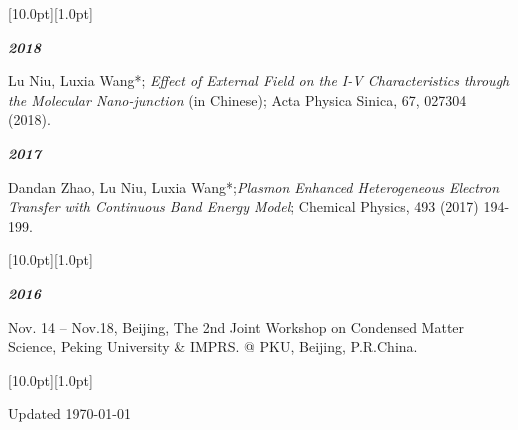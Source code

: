 \documentclass[12pt,a4paper,utf8]{report}
\begin{document}
\begin{minipage}[t]{16cm}
    \colorbox{subtitlecolor}{\raisebox{0pt}[10.0pt][1.0pt]{
        \textcolor{white}{\textsf{}}}}
\end{minipage}\par
\vspace{0.2cm}\hspace{0.5cm}
\begin{minipage}[t]{15cm}
    {\textbf{\em{2018}}}\par
    \quad Lu Niu, Luxia Wang*; {\em{Effect of External Field on the I-V Characteristics through the Molecular Nano-junction}} (in Chinese); Acta Physica Sinica, 67, 027304 (2018).\par
    \vspace{0.2cm}
    {\textbf{\em{2017}}}\par
    \quad Dandan Zhao, Lu Niu, Luxia Wang*;{\em{Plasmon Enhanced Heterogeneous Electron Transfer with Continuous Band Energy Model}}; Chemical Physics, 493 (2017) 194-199.\par
\end{minipage}\par
\vspace{0.4cm}

\begin{minipage}[t]{16cm}
    \colorbox{subtitlecolor}{\raisebox{0pt}[10.0pt][1.0pt]{
        \textcolor{white}{\textsf{}}}}
\end{minipage}\par
\vspace{0.2cm}\hspace{0.5cm}
\begin{minipage}[t]{15cm}
    {\textbf{\em{2016}}}\par
    \quad Nov. 14 -- Nov.18, Beijing, The 2nd Joint Workshop on Condensed Matter Science, Peking University \& IMPRS. @ PKU, Beijing, P.R.China.\par
    \vspace{0.2cm}
\end{minipage}\par
\vspace{0.4cm}

\begin{minipage}[t]{16cm}
    \colorbox{subtitlecolor}{\raisebox{0pt}[10.0pt][1.0pt]{
        \textcolor{white}{\textsf{}}}}
\end{minipage}\par
\vspace{0.2cm}\hspace{0.5cm}
\begin{minipage}[t]{15cm}
    \vspace{0.2cm}
\end{minipage}\par
\vspace{0.4cm}

\begin{center}\vspace{1.0cm}
    Updated \monthyeardate\today
\end{center}
\end{document}
